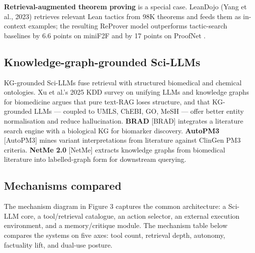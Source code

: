 \documentclass{article}
\begin{document}
\textbf{Retrieval-augmented theorem proving} is a special case. LeanDojo (Yang et al., 2023) \cite{yang2023leandojotheorempro} retrieves relevant Lean tactics from 98K theorems and feeds them as in-context examples; the resulting ReProver model outperforms tactic-search baselines by 6.6 points on miniF2F and by 17 points on ProofNet \cite{azerbayev2023arxiv2302124332023}.

\subsection{Knowledge-graph-grounded Sci-LLMs}\label{knowledge-graph-grounded-sci-llms}

KG-grounded Sci-LLMs fuse retrieval with structured biomedical and chemical ontologies. Xu et al.'s 2025 KDD survey on unifying LLMs and knowledge graphs for biomedicine \cite{xu2025asurveyonunifyingl} argues that pure text-RAG loses structure, and that KG-grounded LLMs --- coupled to UMLS, ChEBI, GO, MeSH --- offer better entity normalisation and reduce hallucination. \textbf{BRAD} {[}BRAD{]} integrates a literature search engine with a biological KG for biomarker discovery. \textbf{AutoPM3} {[}AutoPM3{]} mines variant interpretations from literature against ClinGen PM3 criteria. \textbf{NetMe 2.0} {[}NetMe{]} extracts knowledge graphs from biomedical literature into labelled-graph form for downstream querying.

\subsection{Mechanisms compared}\label{mechanisms-compared}

The mechanism diagram in Figure 3 captures the common architecture: a Sci-LLM core, a tool/retrieval catalogue, an action selector, an external execution environment, and a memory/critique module. The mechanism table below compares the systems on five axes: tool count, retrieval depth, autonomy, factuality lift, and dual-use posture.
\end{document}
